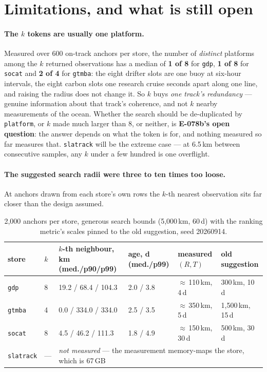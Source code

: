 \documentclass[10pt]{article}
\newcommand{\code}[1]{\texttt{#1}}
\begin{document}
\section{Limitations, and what is still open}

\paragraph{The $k$ tokens are usually one platform.} Measured over 600
on-track anchors per store, the number of \emph{distinct} platforms among the
$k$ returned observations has a median of \textbf{1 of 8} for \code{gdp},
\textbf{1 of 8} for \code{socat} and \textbf{2 of 4} for \code{gtmba}: the
eight drifter slots are one buoy at six-hour intervals, the eight carbon slots
one research cruise seconds apart along one line, and raising the radius does
not change it. So $k$ buys \emph{one track's redundancy} --- genuine information
about that track's coherence, and not $k$ nearby measurements of the ocean.
Whether the search should be de-duplicated by \code{platform}, or $k$ made much
larger than 8, or neither, is \textbf{E-078b's open question}: the answer
depends on what the token is for, and nothing measured so far measures that.
\code{slatrack} will be the extreme case --- at 6.5\,km between consecutive
samples, any $k$ under a few hundred is one overflight.

\paragraph{The suggested search radii were three to ten times too loose.} At anchors drawn from each store's own rows the $k$-th nearest observation sits far closer than the design assumed.

\begin{table}[h]
\centering\footnotesize
\begin{tabular}{@{}llllll@{}}
\toprule
store & $k$ & $k$-th neighbour, km (med./p90/p99) & age, d (med./p99) & measured $(R, T)$ & old suggestion \\
\midrule
\code{gdp}   & 8 & 19.2 / 68.4 / 104.3 & 2.0 / 3.8 & $\approx$\,110\,km, 4\,d & 300\,km, 10\,d \\
\code{gtmba} & 4 & 0.0 / 334.0 / 334.0 & 2.5 / 3.5 & $\approx$\,350\,km, 5\,d & 1,500\,km, 15\,d \\
\code{socat} & 8 & 4.5 / 46.2 / 111.3 & 1.8 / 4.9 & $\approx$\,150\,km, 30\,d & 500\,km, 30\,d \\
\code{slatrack} & --- & \multicolumn{4}{l}{\emph{not measured} --- the measurement memory-maps the store, which is 67\,GB} \\
\bottomrule
\end{tabular}
\caption{2,000 anchors per store, generous search bounds (5,000\,km, 60\,d) with
the ranking metric's scales pinned to the old suggestion, seed 20260914.}
\end{table}
\end{document}
